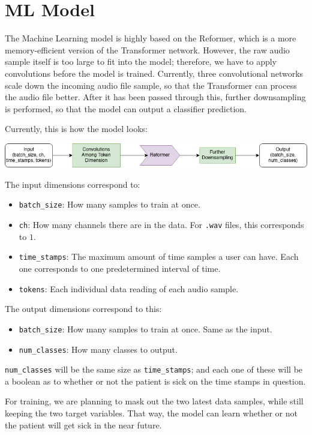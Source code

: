 \documentclass{article}[twocolumn]
\begin{document}
\section{ML Model}
The Machine Learning model is highly based on the Reformer, which is a more memory-efficient version of the Transformer network. However, the raw audio sample itself is too large to fit into the model; therefore, we have to apply convolutions before the model is trained. Currently, three convolutional networks scale down the incoming audio file sample, so that the Transformer can process the audio file better. After it has been passed through this, further downsampling is performed, so that the model can output a classifier prediction.

Currently, this is how the model looks:

\includegraphics[width=1\textwidth]{fig/COVIDetector}

The input dimensions correspond to:
\begin{itemize}
    \item \texttt{batch\_size}: How many samples to train at once.
    \item \texttt{ch}: How many channels there are in the data. For \texttt{.wav} files, this corresponds to $1$.
    \item \texttt{time\_stamps}: The maximum amount of time samples a user can have. Each one corresponds to one predetermined interval of time.
    \item \texttt{tokens}: Each individual data reading of each audio sample.
\end{itemize}

The output dimensions correspond to this:
\begin{itemize}
    \item \texttt{batch\_size}: How many samples to train at once. Same as the input.
    \item \texttt{num\_classes}: How many classes to output.
\end{itemize}

\texttt{num\_classes} will be the same size as \texttt{time\_stamps}; and each one of these will be a boolean as to whether or not the patient is sick on the time stamps in question.

For training, we are planning to mask out the two latest data samples, while still keeping the two target variables. That way, the model can learn whether or not the patient will get sick in the near future.

\end{document}
